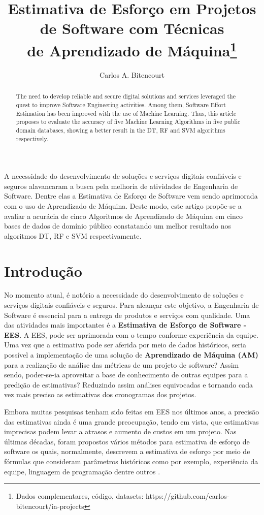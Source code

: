 \documentclass[12pt]{article}
\title{Estimativa de Esforço em Projetos de Software com Técnicas\\ de Aprendizado de Máquina\footnote{Dados complementares, código, datasets: https://github.com/carlos-bitencourt/ia-projects}}
\author{Carlos A. Bitencourt\inst{1}}
\begin{document}
\maketitle

\begin{abstract}
  The need to develop reliable and secure digital solutions and services leveraged the quest to improve Software Engineering activities. Among them, Software Effort Estimation has been improved with the use of Machine Learning. Thus, this article proposes to evaluate the accuracy of five Machine Learning Algorithms in five public domain databases, showing a better result in the DT, RF and SVM algorithms respectively.
\end{abstract}

\begin{resumo}
  A necessidade do desenvolvimento de soluções e serviços digitais confiáveis e seguros alavancaram a busca pela melhoria de atividades de Engenharia de Software. Dentre elas a Estimativa de Esforço de Software vem sendo aprimorada com o uso de Aprendizado de Máquina. Deste modo, este artigo propõe-se a avaliar a acurácia de cinco Algoritmos de Aprendizado de Máquina em cinco bases de dados de domínio público constatando um melhor resultado nos algoritmos DT, RF e SVM respectivamente.

\end{resumo}

\section{Introdução}

No momento atual, é notório a necessidade do desenvolvimento de soluções e serviços digitais confiáveis e seguros. Para alcançar este objetivo, a Engenharia de Software é essencial para a entrega de produtos e serviços com qualidade. Uma das atividades mais importantes é a \textbf{Estimativa de Esforço de Software - EES}. A EES, pode ser aprimorada com o tempo conforme experiência da equipe. Uma vez que a estimativa pode ser aferida por meio de dados históricos, seria possível a implementação de uma solução de \textbf{Aprendizado de Máquina (AM)} para a realização de análise das métricas de um projeto de software? Assim sendo, poder-se-ia aproveitar a base de conhecimento de outras equipes para a predição de estimativas? Reduzindo assim análises equivocadas e tornando cada vez mais preciso as estimativas dos cronogramas dos projetos.

Embora muitas pesquisas tenham sido feitas em EES nos últimos anos, a precisão das estimativas  ainda é uma grande preocupação, tendo em vista, que estimativas imprecisas podem levar a atrasos e aumento de custos em um projeto. Nas últimas décadas, foram propostos vários métodos para estimativa de esforço de software os quais, normalmente, descrevem a estimativa de esforço por meio de fórmulas que consideram parâmetros históricos como por exemplo, experiência da equipe, linguagem de programação dentre outros \cite{asadegravino:2019}.
\end{document}
